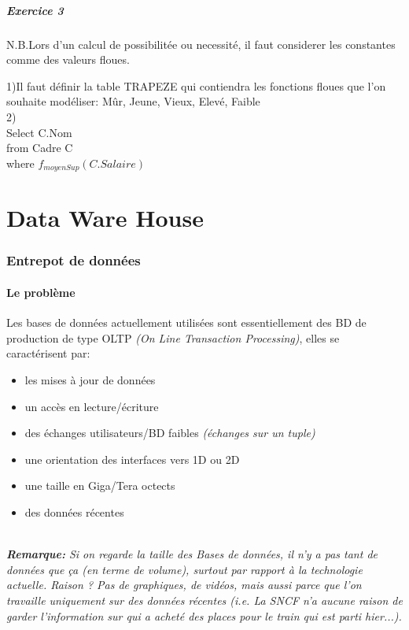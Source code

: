 \documentclass[a4paper,11pt]{article}
\begin{document}
\subsubsection{Exercice 3}

N.B.Lors d'un calcul de possibilitée ou necessité, il faut considerer les constantes comme des valeurs floues.

1)Il faut définir la table TRAPEZE qui contiendra les fonctions floues que l'on souhaite modéliser: Mûr, Jeune, Vieux, Elevé, Faible\\

2)\\
Select C.Nom\\
from Cadre C\\
where $f_{moyenSup}(C.Salaire)$\\

\part{Data Ware House}
\section{Entrepot de données}
\subsection{Le problème}
	Les bases de données actuellement utilisées sont essentiellement des BD de production de type OLTP \emph{(On Line Transaction Processing)}, elles se caractérisent par:
	\begin{itemize}
		\item les mises à jour de données 
		\item un accès en lecture/écriture
		\item des échanges utilisateurs/BD faibles \emph{(échanges sur un tuple)}
		\item une orientation des interfaces vers 1D ou 2D
		\item une taille en Giga/Tera octects
		\item des données récentes
	\end{itemize}
	~\\

\emph{\textbf{Remarque:} Si on regarde la taille des Bases de données, il n'y a pas tant de données que ça (en terme de volume), surtout par rapport à la technologie actuelle. Raison ? Pas de graphiques, de vidéos, mais aussi parce que l'on travaille uniquement sur des données récentes (i.e. La SNCF n'a aucune raison de garder l'information sur qui a acheté des places pour le train qui est parti hier...).}	\\
		
\end{document}
